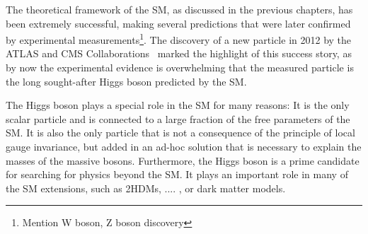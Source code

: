 

The theoretical framework of the SM, as discussed in the previous chapters, has been extremely successful, making several predictions that were later confirmed by experimental measurements\footnote{Mention W boson, Z boson discovery}. 
The discovery of a new particle in 2012 by the ATLAS and CMS Collaborations~\cite{Aad:2012tfa,Chatrchyan:2012xdj} marked the highlight of this success story, as by now the experimental evidence is overwhelming that the measured particle is the long sought-after Higgs boson predicted by the SM.

The Higgs boson plays a special role in the SM for many reasons: It is the only scalar particle and is connected to a large fraction of the free parameters of the SM. It is also the only particle that is not a consequence of the principle of local gauge invariance, but added in an ad-hoc solution that is necessary to explain the masses of the massive bosons. Furthermore, the Higgs boson is a prime candidate for searching for physics beyond the SM. It plays an important role in many of the SM extensions, such as 2HDMs, .... , or dark matter models.

